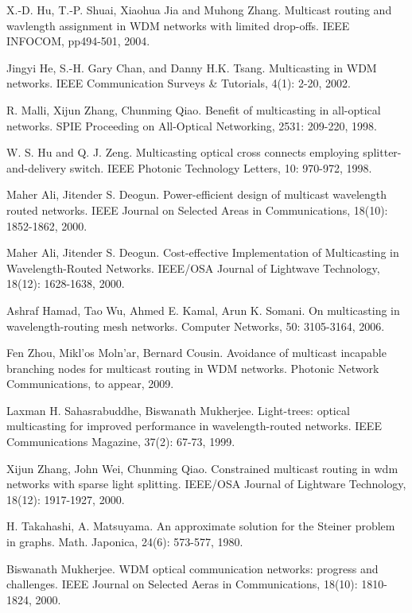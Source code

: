 \documentclass[conference]{IEEEtran}
\begin{document}
\begin{thebibliography}{1}

X.-D. Hu, T.-P. Shuai, Xiaohua Jia and Muhong Zhang. Multicast routing and wavlength assignment in WDM networks with limited drop-offs. IEEE INFOCOM,  pp494-501, 2004.

Jingyi He, S.-H. Gary Chan, and Danny H.K. Tsang. Multicasting in WDM networks. IEEE Communication Surveys \& Tutorials, 4(1): 2-20, 2002.

R. Malli, Xijun Zhang, Chunming Qiao. Benefit of multicasting in all-optical networks. SPIE Proceeding on All-Optical Networking, 2531: 209-220, 1998.

W. S. Hu and Q. J. Zeng. Multicasting optical cross connects employing splitter-and-delivery switch. IEEE Photonic Technology Letters, 10: 970-972, 1998.

Maher Ali, Jitender S. Deogun. Power-efficient design of multicast wavelength routed networks. IEEE Journal on Selected Areas in Communications, 18(10): 1852-1862, 2000.

Maher Ali, Jitender S. Deogun. Cost-effective Implementation of Multicasting in Wavelength-Routed Networks. IEEE/OSA Journal of Lightwave Technology, 18(12): 1628-1638, 2000.

Ashraf Hamad, Tao Wu, Ahmed E. Kamal, Arun K. Somani. On multicasting in wavelength-routing mesh networks. Computer Networks, 50: 3105-3164, 2006.

Fen Zhou, Mikl\a'os Moln\a'ar, Bernard Cousin. Avoidance of multicast
incapable branching nodes for multicast routing in WDM networks. Photonic Network Communications, to appear, 2009.

Laxman H. Sahasrabuddhe, Biswanath Mukherjee. Light-trees: optical multicasting for improved performance in wavelength-routed networks. IEEE Communications Magazine, 37(2): 67-73, 1999.

Xijun Zhang, John Wei, Chunming Qiao. Constrained multicast routing in wdm networks with sparse light splitting. IEEE/OSA Journal of Lightware Technology, 18(12): 1917-1927, 2000.

H. Takahashi, A. Matsuyama. An approximate solution for the Steiner problem in graphs. Math. Japonica, 24(6): 573-577, 1980.

Biswanath Mukherjee. WDM optical communication networks: progress and challenges. IEEE Journal on Selected Aeras in Communications, 18(10): 1810-1824, 2000.


\end{thebibliography}
\end{document}
